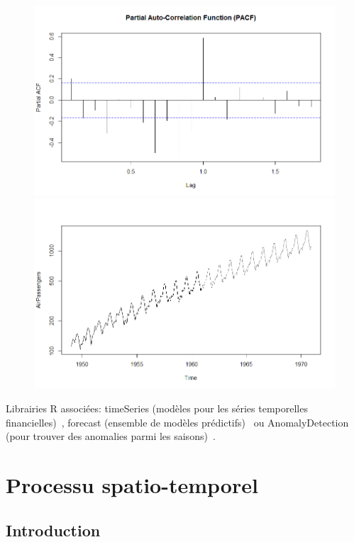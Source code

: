 \begin{figure}[!htb]
  \includegraphics[width=\linewidth]{EtatDeLArt/AR/PACF.png}
\endminipage\hfill
{}
  \includegraphics[width=\linewidth]{EtatDeLArt/AR/Prediction.png}
\endminipage\hfill

\end{figure}

Librairies R associées: timeSeries (modèles pour les séries temporelles financielles)~\cite{timeSeries}, forecast (ensemble de modèles prédictifs)~\cite{forecast} ou AnomalyDetection (pour trouver des anomalies parmi les saisons)~\cite{twitter-anomaly-detection-2015}.

\section{Processu spatio-temporel}

\subsection{Introduction}

